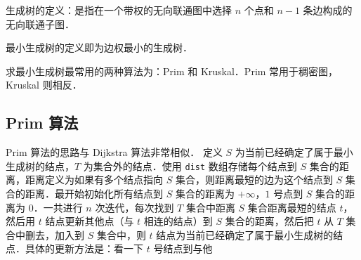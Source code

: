 
\begin{issues}
\issueMissDepend
\end{issues}

生成树的定义：是指在一个带权的无向联通图中选择 $n$ 个点和 $n - 1$ 条边构成的无向联通子图．

最小生成树的定义即为边权最小的生成树．

求最小生成树最常用的两种算法为：Prim 和 Kruskal．Prim 常用于稠密图，Kruskal 则相反．

\subsection{Prim 算法}

Prim 算法的思路与 Dijkstra 算法非常相似．
定义 $S$ 为当前已经确定了属于最小生成树的结点，$T$ 为集合外的结点．使用 \verb|dist| 数组存储每个结点到 $S$ 集合的距离，距离定义为如果有多个结点指向 $S$ 集合，则距离最短的边为这个结点到 $S$ 集合的距离．最开始初始化所有结点到 $S$ 集合的距离为 $+\infty$，$1$ 号点到 $S$ 集合的距离为 $0$．一共进行 $n$ 次迭代，每次找到 $T$ 集合中距离 $S$ 集合距离最短的结点 $t$，然后用 $t$ 结点更新其他点（与 $t$ 相连的结点）到 $S$ 集合的距离，然后把 $t$ 从 $T$ 集合中删去，加入到 $S$ 集合中，则 $t$ 结点为当前已经确定了属于最小生成树的结点．具体的更新方法是：看一下 $t$ 号结点到与他